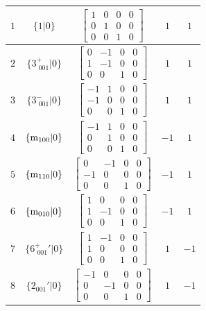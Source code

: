 \documentclass[fleqn,8pt]{jsarticle}
\begin{document}
\begin{longtable}{ccccc}
$ 1 $ & $ \{1|0\} $ & $ \begin{bmatrix} 1 & 0 & 0 & 0 \\ 0 & 1 & 0 & 0 \\ 0 & 0 & 1 & 0 \end{bmatrix} $ & $ 1 $ & $ 1 $ \\ \hline
$ 2 $ & $ \{3^{+}_{\,\,001}|0\} $ & $ \begin{bmatrix} 0 & -1 & 0 & 0 \\ 1 & -1 & 0 & 0 \\ 0 & 0 & 1 & 0 \end{bmatrix} $ & $ 1 $ & $ 1 $ \\ \hline
$ 3 $ & $ \{3^{-}_{\,\,001}|0\} $ & $ \begin{bmatrix} -1 & 1 & 0 & 0 \\ -1 & 0 & 0 & 0 \\ 0 & 0 & 1 & 0 \end{bmatrix} $ & $ 1 $ & $ 1 $ \\ \hline
$ 4 $ & $ \{{\rm m}_{100}|0\} $ & $ \begin{bmatrix} -1 & 1 & 0 & 0 \\ 0 & 1 & 0 & 0 \\ 0 & 0 & 1 & 0 \end{bmatrix} $ & $ -1 $ & $ 1 $ \\ \hline
$ 5 $ & $ \{{\rm m}_{110}|0\} $ & $ \begin{bmatrix} 0 & -1 & 0 & 0 \\ -1 & 0 & 0 & 0 \\ 0 & 0 & 1 & 0 \end{bmatrix} $ & $ -1 $ & $ 1 $ \\ \hline
$ 6 $ & $ \{{\rm m}_{010}|0\} $ & $ \begin{bmatrix} 1 & 0 & 0 & 0 \\ 1 & -1 & 0 & 0 \\ 0 & 0 & 1 & 0 \end{bmatrix} $ & $ -1 $ & $ 1 $ \\ \hline
$ 7 $ & $ \{6^{+}_{\,\,001}{}'|0\} $ & $ \begin{bmatrix} 1 & -1 & 0 & 0 \\ 1 & 0 & 0 & 0 \\ 0 & 0 & 1 & 0 \end{bmatrix} $ & $ 1 $ & $ -1 $ \\ \hline
$ 8 $ & $ \{2{}_{001}{}'|0\} $ & $ \begin{bmatrix} -1 & 0 & 0 & 0 \\ 0 & -1 & 0 & 0 \\ 0 & 0 & 1 & 0 \end{bmatrix} $ & $ 1 $ & $ -1 $ \\ \hline

\end{longtable}
\end{document}
